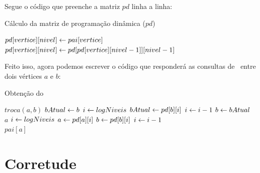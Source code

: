 \vspace{0.2cm}

Segue o código que preenche a matriz $pd$ linha a linha:

\begin{algorithm}[H]
\caption{Cálculo da matriz de programação dinâmica ($pd$)}
\begin{algorithmic}[1]
                \State $pd[vertice][nivel] \leftarrow pai[vertice]$
            \Else
                \State $pd[vertice][nivel] \leftarrow pd[pd[vertice][nivel-1]][nivel-1]$
            \EndIf
        \EndFor
    \EndFor
\EndFunction
\end{algorithmic}
\end{algorithm}

Feito isso, agora podemos escrever o código que responderá as consultas de \LCA\ entre dois vértices $a$ e $b$:

\vspace{0.2cm}

\begin{algorithm}[H]
\caption{Obtenção do \LCA}
\begin{algorithmic}[1]
        \State $troca(a, b)$
    \EndIf
    \State $bAtual \leftarrow b$
    \State $i \leftarrow logNiveis$
            \State $bAtual \leftarrow pd[b][i]$
        \EndIf
        \vspace{-0.2cm}
        \State $i \leftarrow i - 1$
    \EndWhile
    \State $b \leftarrow bAtual$
        \\\hspace{11mm} \Return $a$
    \EndIf
    \State $i \leftarrow logNiveis$
            \State $a \leftarrow pd[a][i]$
            \State $b \leftarrow pd[b][i]$
        \EndIf
        \vspace{-0.2cm}
        \State $i \leftarrow i - 1$
    \EndWhile
    \\\hspace{5mm} \Return $pai[a]$
\EndFunction
\end{algorithmic}
\end{algorithm}

\vspace{10cm}

\section{Corretude}

